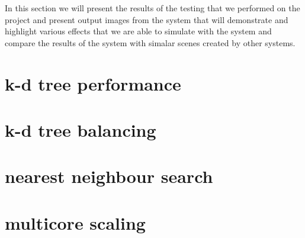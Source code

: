 In this section we will present the results of the testing that we performed on the project and
present output images from the system that will demonstrate and highlight various effects that
we are able to simulate with the system and compare the results of the system with simalar scenes
created by other systems.

\section{k-d tree performance}
\section{k-d tree balancing}
\section{nearest neighbour search}
\section{multicore scaling}
